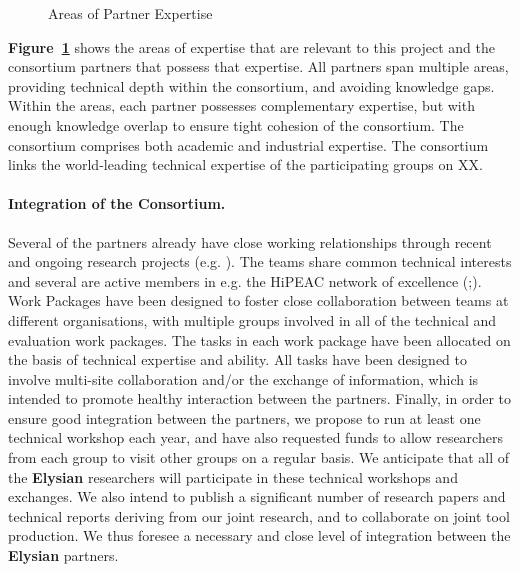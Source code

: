 \documentclass[a4paper,11pt]{article}
\newcommand{\project}[1]{\textbf{#1}\xspace}
\newcommand{\SECURITY}{\project{Elysian}}
\newcommand{\TheProject}{\SECURITY}
\begin{document}
\begin{figure}[t]
\begin{center}
\end{center}
\vspace{-0.3in}
\caption{Areas of Partner Expertise}
\label{fig:consortium}
\end{figure}

\textbf{Figure~\ref{fig:consortium}} shows the areas of expertise that
are relevant to this project and the consortium partners that
possess that expertise.  All partners span multiple areas,
providing technical depth within the consortium, and avoiding
knowledge gaps.  Within the areas, each partner possesses
complementary expertise, but with enough knowledge overlap to
ensure tight cohesion of the consortium. The consortium
comprises both academic and industrial expertise.
The consortium links the world-leading technical expertise of
the participating groups on XX.


\paragraph*{Integration of the Consortium.}

Several of the partners already have close working relationships through
recent and ongoing research projects (e.g. \rephrase).
The teams share common technical interests and several are active members in e.g. the
HiPEAC network of excellence (\SAshort{};).
Work Packages have been designed to foster close collaboration
between teams at different organisations, with multiple groups involved in all of
the technical and evaluation work packages. The tasks in 
each work package have been allocated on the basis of
technical expertise and ability. All tasks have been designed to involve multi-site
collaboration and/or the exchange of information, which is
intended to promote healthy interaction between the partners.
Finally, in order to ensure good integration between the partners,
we propose to run at least one technical workshop each year, and
have also requested funds to allow researchers from each group
to visit other groups on a regular basis.  We anticipate that
all of the \TheProject{} researchers will participate in these
technical workshops and exchanges.  We also intend to publish a significant
number of research papers and technical reports deriving from our joint research,
and to collaborate on joint tool production. 
We thus foresee a necessary and close level of integration between
the \TheProject{} partners.
\end{document}
